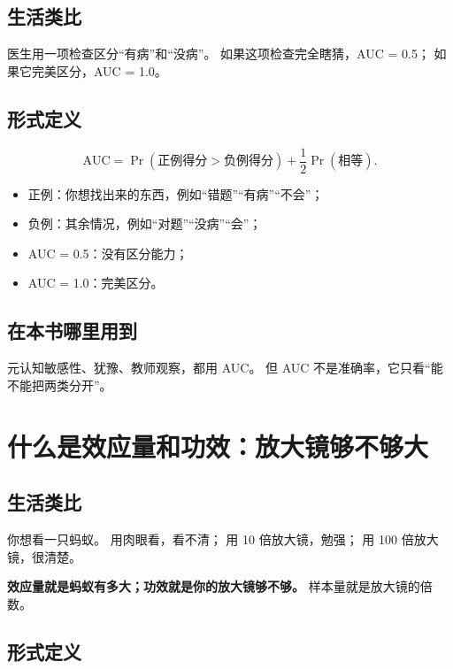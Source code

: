 \documentclass[UTF8,a4paper,11pt]{ctexart}
\begin{document}
\subsection{生活类比}

医生用一项检查区分“有病”和“没病”。
如果这项检查完全瞎猜，AUC = 0.5；
如果它完美区分，AUC = 1.0。

\subsection{形式定义}

\begin{equation}
\mathrm{AUC}
=
\Pr(\text{正例得分}>\text{负例得分})
+\frac12\Pr(\text{相等}).
\end{equation}

\begin{itemize}[leftmargin=2em]
\item 正例：你想找出来的东西，例如“错题”“有病”“不会”；
\item 负例：其余情况，例如“对题”“没病”“会”；
\item AUC = 0.5：没有区分能力；
\item AUC = 1.0：完美区分。
\end{itemize}

\subsection{在本书哪里用到}

元认知敏感性、犹豫、教师观察，都用 AUC。
但 AUC 不是准确率，它只看“能不能把两类分开”。


\section{什么是效应量和功效：放大镜够不够大}

\subsection{生活类比}

你想看一只蚂蚁。
用肉眼看，看不清；
用 10 倍放大镜，勉强；
用 100 倍放大镜，很清楚。

\textbf{效应量就是蚂蚁有多大；功效就是你的放大镜够不够。}
样本量就是放大镜的倍数。

\subsection{形式定义}
\end{document}
